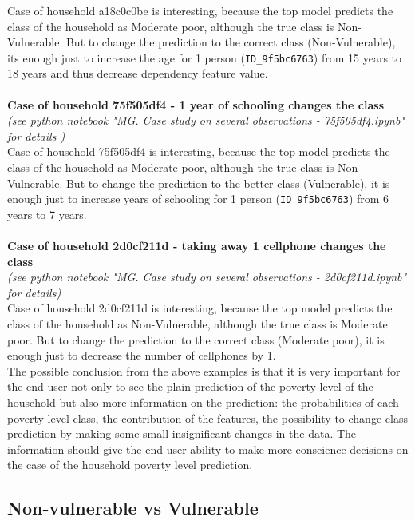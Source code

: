     Case of household a18c0c0be is interesting, because the top model predicts the class of the household as Moderate poor, although the true class is Non-Vulnerable. But to change the prediction to the correct class (Non-Vulnerable), its enough just to increase the age for 1 person (\verb|ID_9f5bc6763|) from 15 years to 18 years and thus decrease dependency feature value.\\        
    \\
\textbf{Case of household 75f505df4 - 1 year of schooling changes the class}\\
\textit{(see python notebook "MG. Case study on several observations - 75f505df4.ipynb" for details \cite{our_github})}\\

    Case of household 75f505df4 is interesting, because the top model predicts the class of the household as Moderate poor, although the true class is Non-Vulnerable. But to change the prediction to the better class (Vulnerable), it is enough just to increase years of schooling for 1 person (\verb|ID_9f5bc6763|) from 6 years to 7 years.\\
\\
\textbf{Case of household 2d0cf211d - taking away 1 cellphone changes the class}\\
\textit{(see python notebook "MG. Case study on several observations - 2d0cf211d.ipynb" for details\cite{our_github})}\\

    Case of household 2d0cf211d is interesting, because the top model predicts the class of the household as Non-Vulnerable, although the true class is Moderate poor. But to change the prediction to the correct class (Moderate poor), it is enough just to decrease the number of cellphones by 1.\\

    The possible conclusion from the above examples is that it is very important for the end user not only to see the plain prediction of the poverty level of the household but also more information on the prediction: the probabilities of each poverty level class, the contribution of the features, the possibility to change class prediction by making some small insignificant changes in the data. The information should give the end user ability to make more conscience decisions on the case of the household poverty level prediction.

    \subsection{Non-vulnerable vs Vulnerable}
